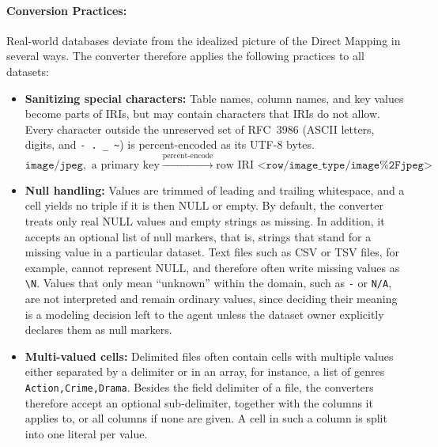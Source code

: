 \paragraph{Conversion Practices:}Real-world databases deviate from the idealized picture of the Direct Mapping in several ways. The converter therefore applies the following practices to all datasets:
\begin{itemize}[leftmargin=*, itemsep=2pt]
  \item \textbf{Sanitizing special characters:} Table names, column names, and key values become parts of IRIs, but may contain characters that IRIs do not allow. Every character outside the unreserved set of RFC~3986 (ASCII letters, digits, and \texttt{-~.~\_~\textasciitilde}) is percent-encoded as its UTF-8 bytes. 
  \[
  \texttt{image/jpeg}, \text{ a primary key} \xrightarrow{\text{percent-encode}} \text{row IRI } \texttt{<row/image\_type/image\%2Fjpeg>}
  \]
 \item \textbf{Null handling:} Values are trimmed of leading and trailing whitespace, and a cell yields no triple if it is then NULL or empty. By default, the converter treats only real NULL values and empty strings as missing. In addition, it accepts an optional list of null markers, that is, strings that stand for a missing value in a particular dataset. Text files such as CSV or TSV files, for example, cannot represent NULL, and therefore often write missing values as \texttt{\textbackslash N}. Values that only mean ``unknown'' within the domain, such as \texttt{-} or \texttt{N/A}, are not interpreted and remain ordinary values, since deciding their meaning is a modeling decision left to the agent unless the dataset owner explicitly declares them as null markers.

  \item \textbf{Multi-valued cells:} Delimited files often contain cells with multiple values either separated by a delimiter or in an array, for instance, a list of genres \texttt{Action,Crime,Drama}. Besides the field delimiter of a file, the converters therefore accept an optional sub-delimiter, together with the columns it applies to, or all columns if none are given. A cell in such a column is split into one literal per value. 


\end{itemize}
